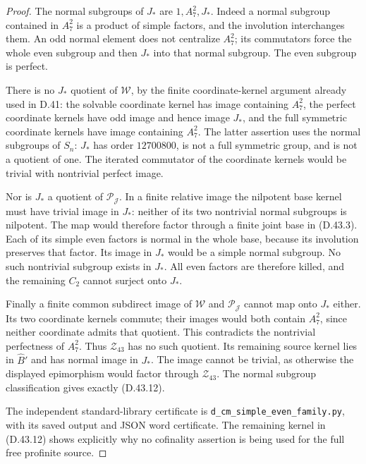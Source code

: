\begin{proof}
The normal
subgroups of
$J_*$ are
$1,A_7^2,J_*$.
Indeed a normal
subgroup contained
in $A_7^2$
is a product
of simple
factors, and
the involution
interchanges
them. An odd
normal element
does not
centralize
$A_7^2$;
its commutators
force the whole
even subgroup
and then
$J_*$ into
that normal
subgroup.
The even
subgroup is
perfect.

There is no
$J_*$ quotient
of $\mathcal W$,
by the finite
coordinate-kernel
argument already
used in D.41:
the solvable
coordinate
kernel has
image containing
$A_7^2$,
the perfect
coordinate
kernels have
odd image and
hence image
$J_*$, and
the full
symmetric
coordinate
kernels have
image containing
$A_7^2$.
The latter
assertion uses
the normal
subgroups of
$S_n$: $J_*$
has order
$12700800$,
is not a
full symmetric
group, and
is not a
quotient of
one. The
iterated
commutator
of the
coordinate
kernels
would be
trivial with
nontrivial
perfect image.

Nor is
$J_*$
a quotient
of
$\mathcal P_{\mathscr J}$.
In a finite
relative image
the nilpotent
base kernel
must have
trivial image
in $J_*$:
neither of
its two
nontrivial
normal subgroups
is nilpotent.
The map would
therefore factor
through a finite
joint base in
(D.43.3).
Each of its
simple even
factors is
normal in the
whole base,
because its
involution
preserves
that factor.
Its image
in $J_*$
would be
a simple
normal subgroup.
No such
nontrivial
subgroup
exists in
$J_*$.
All even
factors are
therefore
killed, and
the remaining
$C_2$
cannot surject
onto $J_*$.

Finally a finite
common subdirect
image of
$\mathcal W$
and
$\mathcal P_{\mathscr J}$
cannot map
onto $J_*$
either.
Its two
coordinate
kernels commute;
their images
would both
contain
$A_7^2$,
since neither
coordinate
admits that
quotient.
This contradicts
the nontrivial
perfectness
of $A_7^2$.
Thus
$\mathcal Z_{43}$
has no such
quotient.
Its remaining
source kernel
lies in
$\widehat B'$
and has
normal image
in $J_*$.
The image
cannot be
trivial,
as otherwise
the displayed
epimorphism
would factor
through
$\mathcal Z_{43}$.
The normal
subgroup
classification
gives exactly
(D.43.12).

The independent
standard-library
certificate is
\texttt{d\_cm\_simple\_even\_family.py},
with its saved
output and
JSON word
certificate.
The remaining
kernel in
(D.43.12)
shows explicitly
why no
cofinality
assertion is
being used
for the full
free profinite
source.
\end{proof}
